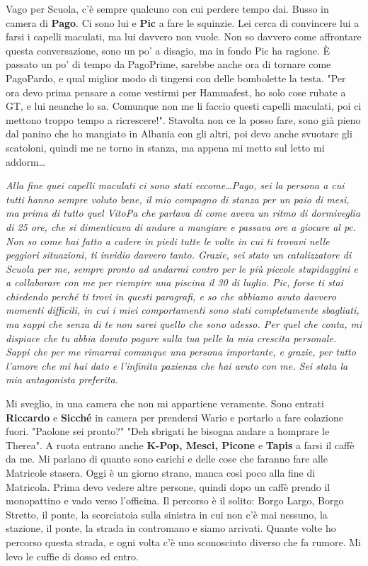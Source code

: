 Vago per Scuola, c'è sempre qualcuno con cui perdere tempo dai. Busso in camera di \textbf{Pago}. Ci sono lui e \textbf{Pic} a fare le squinzie. Lei cerca di convincere lui a farsi i capelli maculati, ma lui davvero non vuole. Non so davvero come affrontare questa conversazione, sono un po' a disagio, ma in fondo Pic ha ragione. È passato un po' di tempo da PagoPrime, sarebbe anche ora di tornare come PagoPardo, e qual miglior modo di tingersi con delle bombolette la testa. "Per ora devo prima pensare a come vestirmi per Hammafest, ho solo cose rubate a GT, e lui neanche lo sa. Comunque non me li faccio questi capelli maculati, poi ci mettono troppo tempo a ricrescere!". Stavolta non ce la posso fare, sono già pieno dal panino che ho mangiato in Albania con gli altri, poi devo anche svuotare gli scatoloni, quindi me ne torno in stanza, ma appena mi metto sul letto mi addorm\dots
\vspace{5mm}

\textit{Alla fine quei capelli maculati ci sono stati eccome\dots Pago, sei la persona a cui tutti hanno sempre voluto bene, il mio compagno di stanza per un paio di mesi, ma prima di tutto quel VitoPa che parlava di come aveva un ritmo di dormiveglia di 25 ore, che si dimenticava di andare a mangiare e passava ore a giocare al pc. Non so come hai fatto a cadere in piedi tutte le volte in cui ti trovavi nelle peggiori situazioni, ti invidio davvero tanto. Grazie, sei stato un catalizzatore di Scuola per me, sempre pronto ad andarmi contro per le più piccole stupidaggini e a collaborare con me per riempire una piscina il 30 di luglio. Pic, forse ti stai chiedendo perché ti trovi in questi paragrafi, e so che abbiamo avuto davvero momenti difficili, in cui i miei comportamenti sono stati completamente sbagliati, ma sappi che senza di te non sarei quello che sono adesso. Per quel che conta, mi dispiace che tu abbia dovuto pagare sulla tua pelle la mia crescita personale. Sappi che per me rimarrai comunque una persona importante, e grazie, per tutto l'amore che mi hai dato e l'infinita pazienza che hai avuto con me. Sei stata la mia antagonista preferita.}

\separatore

Mi sveglio, in una camera che non mi appartiene veramente. Sono entrati \textbf{Riccardo} e \textbf{Sicché} in camera per prendersi Wario e portarlo a fare colazione fuori. "Paolone sei pronto?" "Deh sbrigati he bisogna andare a homprare le Therea". A ruota entrano anche \textbf{K-Pop, Mesci, Picone} e \textbf{Tapis} a farsi il caffè da me. Mi parlano di quanto sono carichi e delle cose che faranno fare alle Matricole stasera. Oggi è un giorno strano, manca così poco alla fine di Matricola. Prima devo vedere altre persone, quindi dopo un caffè prendo il monopattino e vado verso l'officina. Il percorso è il solito: Borgo Largo, Borgo Stretto, il ponte, la scorciatoia sulla sinistra in cui non c'è mai nessuno, la stazione, il ponte, la strada in contromano e siamo arrivati. Quante volte ho percorso questa strada, e ogni volta c'è uno sconosciuto diverso che fa rumore. Mi levo le cuffie di dosso ed entro.
\vspace{5mm}

